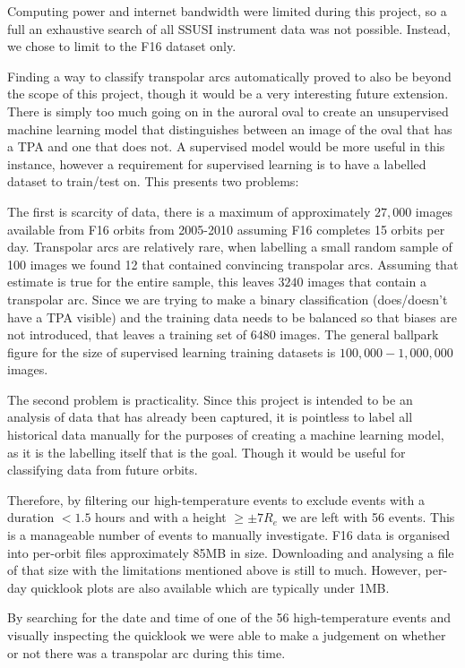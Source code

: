 \documentclass[12pt]{article}
\begin{document}
Computing power and internet bandwidth were limited during this project, so a full an exhaustive search of all SSUSI instrument data was not possible. Instead, we chose to limit to the F16 dataset only.

Finding a way to classify transpolar arcs automatically proved to also be beyond the scope of this project, though it would be a very interesting future extension. There is simply too much going on in the auroral oval to create an unsupervised machine learning model that distinguishes between an image of the oval that has a TPA and one that does not. A supervised model would be more useful in this instance, however a requirement for supervised learning is to have a labelled dataset to train/test on. This presents two problems:

The first is scarcity of data, there is a maximum of approximately $27,000$ images available from F16 orbits from 2005-2010 assuming F16 completes 15 orbits per day. Transpolar arcs are relatively rare, when labelling a small random sample of 100 images we found 12 that contained convincing transpolar arcs. Assuming that estimate is true for the entire sample, this leaves $3240$ images that contain a transpolar arc. Since we are trying to make a binary classification (does/doesn't have a TPA visible) and the training data needs to be balanced so that biases are not introduced, that leaves a training set of $6480$ images. The general ballpark figure for the size of supervised learning training datasets is $100,000-1,000,000$ images.

The second problem is practicality. Since this project is intended to be an analysis of data that has already been captured, it is pointless to label all historical data manually for the purposes of creating a machine learning model, as it is the labelling itself that is the goal. Though it would be useful for classifying data from future orbits.

Therefore, by filtering our high-temperature events to exclude events with a duration $< 1.5$ hours and with a height $\ge\pm7R_e$ we are left with 56 events. This is a manageable number of events to manually investigate. F16 data is organised into per-orbit files approximately 85MB in size. Downloading and analysing a file of that size with the limitations mentioned above is still to much. However, per-day quicklook plots are also available which are typically under 1MB. 

By searching for the date and time of one of the 56 high-temperature events and visually inspecting the quicklook we were able to make a judgement on whether or not there was a transpolar arc during this time.
\end{document}

